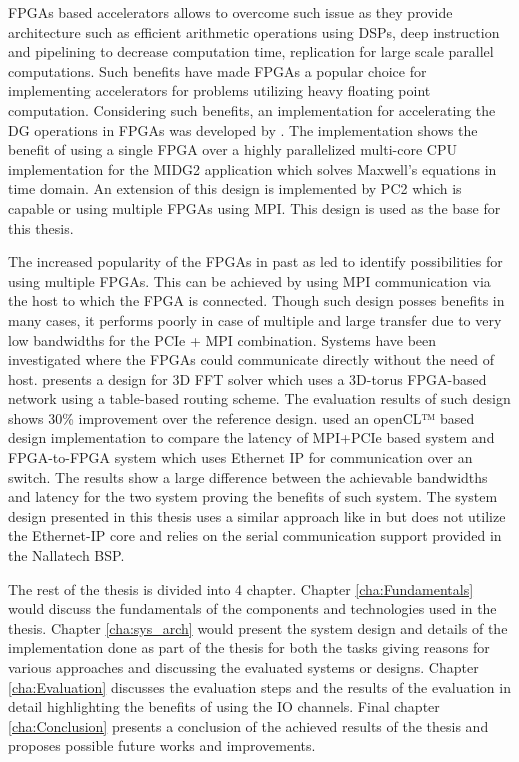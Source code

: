 FPGAs based accelerators allows to overcome such issue as they provide architecture
such as efficient arithmetic operations using DSPs, deep instruction and pipelining
to decrease computation time, replication for large scale parallel computations.
Such benefits have made FPGAs a popular choice for implementing accelerators for
problems utilizing heavy floating point computation. Considering such benefits,
an implementation for accelerating the \ac{DG} operations in FPGAs was
developed by \textcite{kenter_opencl-based_2018}. The implementation shows the benefit
of using a single FPGA over a highly parallelized multi-core CPU implementation for
the MIDG2 application which solves Maxwell’s equations in time domain. An extension
of this design is implemented by PC2 which is capable or using multiple FPGAs using MPI.
This design is used as the base for this thesis.

The increased popularity of the FPGAs in past as led to identify possibilities for
using multiple FPGAs. This can be achieved by using MPI communication via the host
to which the FPGA is connected. Though such design posses benefits in many cases, 
it performs poorly in case of multiple and large transfer due to very low bandwidths
for the PCIe + MPI combination. Systems have been investigated where the FPGAs could
communicate directly without the need of host. \textcite{sheng_hpc_2017} presents a design
for 3D FFT solver which uses a 3D-torus FPGA-based network using a table-based routing
scheme. The evaluation results of such design shows 30\% improvement over the reference design.
\textcite{kobayashi_opencl-ready_2018} used an openCL™ based design implementation to 
compare the latency of MPI+PCIe based system and FPGA-to-FPGA system which uses Ethernet
IP for communication over an switch. The results show a large difference between the achievable
bandwidths and latency for the two system proving the benefits of such system. The system
design presented in this thesis uses a similar approach like in \cite{kobayashi_opencl-ready_2018}
but does not utilize the Ethernet-IP core and relies on the serial communication
support provided in the Nallatech BSP.


The rest of the thesis is divided into 4 chapter. Chapter \ref{cha:Fundamentals} would
discuss the fundamentals of the components and technologies used in the thesis.
Chapter \ref{cha:sys_arch} would present the system design and details of the implementation
done as part of the thesis for both the tasks giving reasons for various approaches and discussing
the evaluated systems or designs. Chapter \ref{cha:Evaluation} discusses the evaluation steps
and the results of the evaluation in detail highlighting the benefits of using the IO channels.
Final chapter \ref{cha:Conclusion} presents a conclusion of the achieved results of the thesis
and proposes possible future works and improvements.